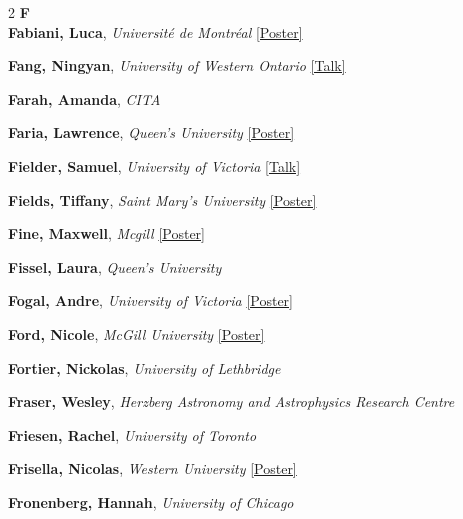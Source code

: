 \begin{small}
\begin{multicols}{2}
{\sffamily\bfseries\color{cascablue}\large F}\\[2pt]

\textbf{Fabiani, Luca}, {\footnotesize\textit{Université de Montréal}} \hyperref[poster-abstract-page-talk-285]{\scriptsize\textcolor{cascateal}{[Poster]}}\par
\textbf{Fang, Ningyan}, {\footnotesize\textit{University of Western Ontario}} \hyperref[abstract-page-talk-161]{\scriptsize\textcolor{cascablue}{[Talk]}}\par
\textbf{Farah, Amanda}, {\footnotesize\textit{CITA}}\par
\textbf{Faria, Lawrence}, {\footnotesize\textit{Queen's University}} \hyperref[poster-abstract-page-talk-34]{\scriptsize\textcolor{cascateal}{[Poster]}}\par
\textbf{Fielder, Samuel}, {\footnotesize\textit{University of Victoria}} \hyperref[abstract-page-talk-328]{\scriptsize\textcolor{cascablue}{[Talk]}}\par
\textbf{Fields, Tiffany}, {\footnotesize\textit{Saint Mary's University}} \hyperref[poster-abstract-page-talk-115]{\scriptsize\textcolor{cascateal}{[Poster]}}\par
\textbf{Fine, Maxwell}, {\footnotesize\textit{Mcgill}} \hyperref[poster-abstract-page-talk-146]{\scriptsize\textcolor{cascateal}{[Poster]}}\par
\textbf{Fissel, Laura}, {\footnotesize\textit{Queen's University}}\par
\textbf{Fogal, Andre}, {\footnotesize\textit{University of Victoria}} \hyperref[poster-abstract-page-talk-287]{\scriptsize\textcolor{cascateal}{[Poster]}}\par
\textbf{Ford, Nicole}, {\footnotesize\textit{McGill University}} \hyperref[poster-abstract-page-talk-239]{\scriptsize\textcolor{cascateal}{[Poster]}}\par
\textbf{Fortier, Nickolas}, {\footnotesize\textit{University of Lethbridge}}\par
\textbf{Fraser, Wesley}, {\footnotesize\textit{Herzberg Astronomy and Astrophysics Research Centre}}\par
\textbf{Friesen, Rachel}, {\footnotesize\textit{University of Toronto}}\par
\textbf{Frisella, Nicolas}, {\footnotesize\textit{Western University}} \hyperref[poster-abstract-page-talk-185]{\scriptsize\textcolor{cascateal}{[Poster]}}\par
\textbf{Fronenberg, Hannah}, {\footnotesize\textit{University of Chicago}}\par


\end{multicols}
\end{small}
